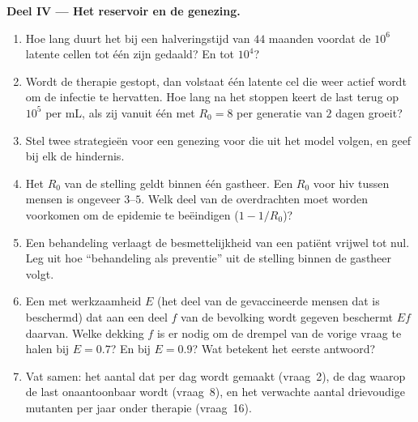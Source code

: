 \begin{problem}
\medskip
\noindent\textbf{Deel IV --- Het reservoir en de genezing.}
\begin{enumerate}[resume]
  \item Hoe lang duurt het bij een halveringstijd van $44$ maanden
        voordat de $10^{6}$ latente cellen tot één zijn gedaald? En tot
        $10^{4}$?
  \item Wordt de therapie gestopt, dan volstaat één latente cel die
        weer actief wordt om de infectie te hervatten. Hoe lang na het
        stoppen keert de last terug op $10^{5}$ per mL, als zij vanuit
        één  met $R_{0} = 8$ per generatie van $2$ dagen groeit?
  \item Stel twee strategieën voor een genezing voor die uit het model
        volgen, en geef bij elk de hindernis.
  \item Het $R_{0}$ van de stelling geldt binnen één gastheer. Een
        $R_{0}$ voor hiv tussen mensen is ongeveer $3$--$5$. Welk deel
        van de overdrachten moet worden voorkomen om de epidemie te
        beëindigen ($1 - 1/R_{0}$)?
  \item Een behandeling verlaagt de besmettelijkheid van een patiënt
        vrijwel tot nul. Leg uit hoe ``behandeling als preventie'' uit
        de stelling binnen de gastheer volgt.
  \item Een  met werkzaamheid $E$ (het deel van de gevaccineerde
        mensen dat is beschermd) dat aan een deel $f$ van de bevolking
        wordt gegeven beschermt $Ef$ daarvan. Welke dekking $f$ is er
        nodig om de drempel van de vorige vraag te halen bij $E = 0.7$?
        En bij $E = 0.9$? Wat betekent het eerste antwoord?
  \item Vat samen: het aantal  dat per dag wordt gemaakt
        (vraag~2), de dag waarop de last onaantoonbaar wordt (vraag~8),
        en het verwachte aantal drievoudige mutanten per jaar onder
        therapie (vraag~16).
\end{enumerate}
\end{problem}
